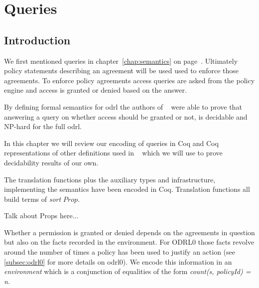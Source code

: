 \chapter{Queries}\label{chap:queries}


\section{Introduction}


We first mentioned queries in chapter~\ref{chap:semantics} on page~\pageref{chap:semantics}. Ultimately policy statements describing an agreement will be used used to enforce those agreements. To enforce policy agreements access queries are asked from the policy engine and access is granted or denied based on the answer.

By defining formal semantics for \ac{odrl} the authors of ~\cite{pucella2006} were able to prove that answering a query on whether access should be granted or not, is decidable and NP-hard for the full \ac{odrl}. 

In this chapter we will review our encoding of queries in Coq and Coq representations of other definitions used in ~\cite{pucella2006} which we will use to prove decidability results of our own. 














 



The translation functions plus the auxiliary types and infrastructure, implementing the semantics have been encoded in Coq. Translation functions all build terms of \emph{sort} $Prop$. 

Talk about Props here...


Whether a permission is granted or denied depends on the agreements in question but also on the facts recorded in the environment. For ODRL0 those facts revolve around the number of times a policy has been used to justify an action (see \ref{subsec:odrl0} for more details on odrl0). We encode this information in an \emph{environment} which is a conjunction of equalities of the form \emph{count(s, policyId) = n}. 

